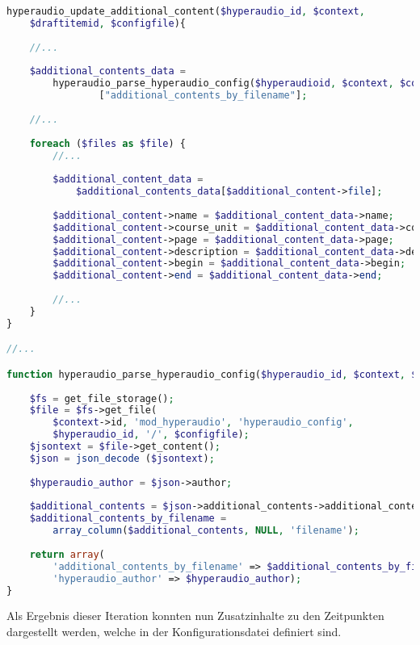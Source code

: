 \begin{lstlisting}[language=php,
             linewidth=\textwidth,
             caption={Ausschnitt der \textbf{locallib.php} in der 3. Iteration},
             label={lst:it3:locallib}]
hyperaudio_update_additional_content($hyperaudio_id, $context,
    $draftitemid, $configfile){
	
    //...
	
    $additional_contents_data = 
        hyperaudio_parse_hyperaudio_config($hyperaudioid, $context, $configfile)
                ["additional_contents_by_filename"];
    
    //...
	
    foreach ($files as $file) {        
        //...
        
        $additional_content_data =
            $additional_contents_data[$additional_content->file];
        
        $additional_content->name = $additional_content_data->name;
        $additional_content->course_unit = $additional_content_data->course_unit;
        $additional_content->page = $additional_content_data->page;
        $additional_content->description = $additional_content_data->description;
        $additional_content->begin = $additional_content_data->begin;
        $additional_content->end = $additional_content_data->end;
        
        //...
    }    
}

//...

function hyperaudio_parse_hyperaudio_config($hyperaudio_id, $context, $configfile) {
    
    $fs = get_file_storage();
    $file = $fs->get_file(
        $context->id, 'mod_hyperaudio', 'hyperaudio_config',
        $hyperaudio_id, '/', $configfile);
    $jsontext = $file->get_content();
    $json = json_decode ($jsontext);
    
    $hyperaudio_author = $json->author;
    
    $additional_contents = $json->additional_contents->additional_content;
    $additional_contents_by_filename =
        array_column($additional_contents, NULL, 'filename');
    
    return array(
        'additional_contents_by_filename' => $additional_contents_by_filename,
        'hyperaudio_author' => $hyperaudio_author);
}
\end{lstlisting}



Als Ergebnis dieser Iteration konnten nun Zusatzinhalte zu den Zeitpunkten dargestellt werden, welche in der Konfigurationsdatei definiert sind.

